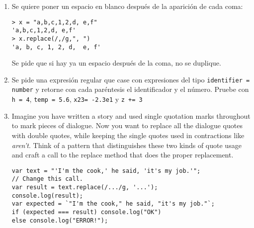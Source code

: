 \begin{Shaded}
\begin{Highlighting}[]
 
    \NormalTok{: }\NormalTok{,}
    \NormalTok{: }\NormalTok{,}
    \NormalTok{: }\NormalTok{,}
    \NormalTok{: }\NormalTok{,}
    \NormalTok{: }\NormalTok{,}
    \NormalTok{: }
  \NormalTok{\};}

 
   \NormalTok{(}\NormalTok{, } 
     \NormalTok{____________;}
  \NormalTok{\});}
\end{Highlighting}
\end{Shaded}

\begin{enumerate}
\def\labelenumi{\arabic{enumi}.}
\setcounter{enumi}{1}
\item
  Se quiere poner un espacio en blanco después de la aparición de cada
  coma:

\begin{verbatim}
> x = "a,b,c,1,2,d, e,f"
'a,b,c,1,2,d, e,f'
> x.replace(/,/g,", ")
'a, b, c, 1, 2, d,  e, f'
\end{verbatim}

  Se pide que si hay ya un espacio después de la coma, no se duplique.
\item
  Se pide una expresión regular que case con expresiones del tipo
  \texttt{identifier = number} y retorne con cada paréntesis el
  identificador y el número. Pruebe con \texttt{h     = 4},
  \texttt{temp = 5.6}, \texttt{x23= -2.3e1} y \texttt{z += 3}
\item
  Imagine you have written a story and used single quotation marks
  throughout to mark pieces of dialogue. Now you want to replace all the
  dialogue quotes with double quotes, while keeping the single quotes
  used in contractions like \emph{aren't}. Think of a pattern that
  distinguishes these two kinds of quote usage and craft a call to the
  replace method that does the proper replacement.

\begin{verbatim}
var text = "'I'm the cook,' he said, 'it's my job.'";
// Change this call.
var result = text.replace(/.../g, '...');
console.log(result);
var expected = `"I'm the cook," he said, "it's my job."`;
if (expected === result) console.log("OK")
else console.log("ERROR!");
\end{verbatim}
\end{enumerate}
